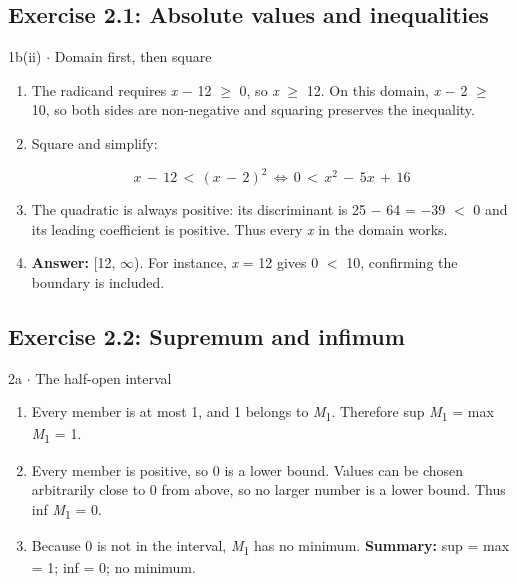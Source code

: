 \documentclass[11pt]{article}
\begin{document}
\begin{keepsection}\subsection{Exercise 2.1: Absolute values and inequalities}

\begin{workedbox}{1b(ii) \ensuremath{\cdot} Domain first, then square}
\begin{enumerate}
\item The radicand requires \textit{x} \ensuremath{-} 12 \ensuremath{\geq} 0, so \textit{x} \ensuremath{\geq} 12. On this domain, \textit{x} \ensuremath{-} 2 \ensuremath{\geq} 10, so both sides are non-negative and squaring preserves the inequality.
\item {}
Square and simplify:

\begin{equation*}{x}\, -\, 12\, <\, ({x}\, -\, 2)^{2}\, \Leftrightarrow \, 0\, <\, {x}^{2}\, -\, 5{x}\, +\, 16\end{equation*}
\item The quadratic is always positive: its discriminant is 25 \ensuremath{-} 64 = \ensuremath{-}39 \ensuremath{<} 0 and its leading coefficient is positive. Thus every \textit{x} in the domain works.
\item \textbf{Answer:} [12, \ensuremath{\infty}). For instance, \textit{x} = 12 gives 0 \ensuremath{<} 10, confirming the boundary is included.
\end{enumerate}
\end{workedbox}

\end{keepsection}
\begin{keepsection}\subsection{Exercise 2.2: Supremum and infimum}

\begin{workedbox}{2a \ensuremath{\cdot} The half-open interval}
\begin{enumerate}
\item Every member is at most 1, and 1 belongs to \textit{M}\textsubscript{1}. Therefore sup \textit{M}\textsubscript{1} = max \textit{M}\textsubscript{1} = 1.
\item Every member is positive, so 0 is a lower bound. Values can be chosen arbitrarily close to 0 from above, so no larger number is a lower bound. Thus inf \textit{M}\textsubscript{1} = 0.
\item Because 0 is not in the interval, \textit{M}\textsubscript{1} has no minimum. \textbf{Summary:} sup = max = 1; inf = 0; no minimum.
\end{enumerate}
\end{workedbox}

\end{keepsection}
\end{document}
